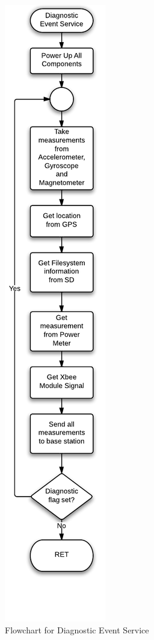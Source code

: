 \begin{figure}[H]
	\centering
	\includegraphics[scale=0.65]{img/DiagnosticEventService}
	\caption{Flowchart for Diagnostic Event Service \label{fig:diagnosticMode}}
\end{figure}

